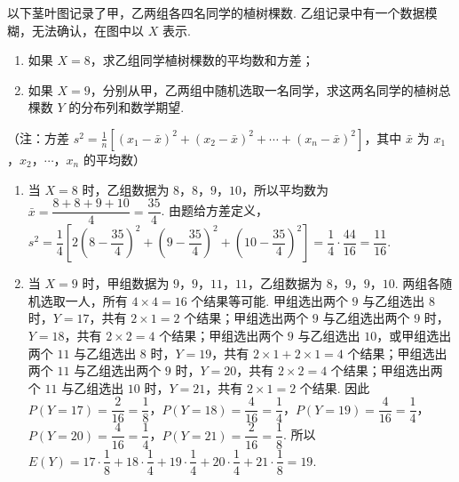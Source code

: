 \begin{problem}
以下茎叶图记录了甲，乙两组各四名同学的植树棵数. 乙组记录中有一个数据模糊，无法确认，在图中以 \(X\) 表示.



\begin{enumerate}
\item 如果 \(X = 8\)，求乙组同学植树棵数的平均数和方差；
\item 如果 \(X = 9\)，分别从甲，乙两组中随机选取一名同学，求这两名同学的植树总棵数 \(Y\) 的分布列和数学期望.
\end{enumerate}

（注：方差 \(s^2 = \frac{1}{n}\left[(x_1 - \bar{x})^2 + (x_2 - \bar{x})^2 + \cdots + (x_n - \bar{x})^2\right]\)，其中 \(\bar{x}\) 为 \(x_1\)，\(x_2\)，\(\cdots\)，\(x_n\) 的平均数）

\begin{solution}
\begin{enumerate}
\item 当 \(X=8\) 时，乙组数据为 \(8\)，\(8\)，\(9\)，\(10\)，所以平均数为 \(\bar{x}=\dfrac{8+8+9+10}{4}=\dfrac{35}{4}\). 由题给方差定义，
\(s^2=\dfrac14\left[2\left(8-\dfrac{35}{4}\right)^2+\left(9-\dfrac{35}{4}\right)^2+\left(10-\dfrac{35}{4}\right)^2\right]=\dfrac14\cdot\dfrac{44}{16}=\dfrac{11}{16}\).
\item 当 \(X=9\) 时，甲组数据为 \(9\)，\(9\)，\(11\)，\(11\)，乙组数据为 \(8\)，\(9\)，\(9\)，\(10\). 两组各随机选取一人，所有 \(4\times4=16\) 个结果等可能. 甲组选出两个 \(9\) 与乙组选出 \(8\) 时，\(Y=17\)，共有 \(2\times1=2\) 个结果；甲组选出两个 \(9\) 与乙组选出两个 \(9\) 时，\(Y=18\)，共有 \(2\times2=4\) 个结果；甲组选出两个 \(9\) 与乙组选出 \(10\)，或甲组选出两个 \(11\) 与乙组选出 \(8\) 时，\(Y=19\)，共有 \(2\times1+2\times1=4\) 个结果；甲组选出两个 \(11\) 与乙组选出两个 \(9\) 时，\(Y=20\)，共有 \(2\times2=4\) 个结果；甲组选出两个 \(11\) 与乙组选出 \(10\) 时，\(Y=21\)，共有 \(2\times1=2\) 个结果. 因此
\(P(Y=17)=\dfrac{2}{16}=\dfrac18\)，\(P(Y=18)=\dfrac{4}{16}=\dfrac14\)，\(P(Y=19)=\dfrac{4}{16}=\dfrac14\)，\(P(Y=20)=\dfrac{4}{16}=\dfrac14\)，\(P(Y=21)=\dfrac{2}{16}=\dfrac18\). 所以
\(E(Y)=17\cdot\dfrac18+18\cdot\dfrac14+19\cdot\dfrac14+20\cdot\dfrac14+21\cdot\dfrac18=19\).
\end{enumerate}
\end{solution}
\end{problem}


